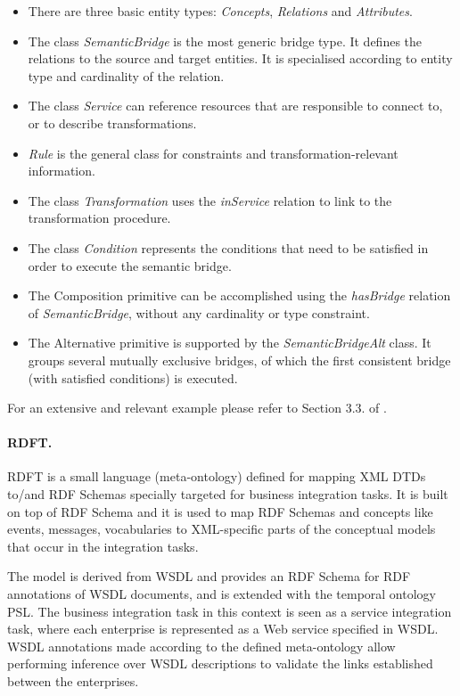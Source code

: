 \documentclass{fast_latex}
\begin{document}
\begin{itemize}
\item There are three basic entity types: \textit{Concepts},
\textit{Relations} and \textit{Attributes}. 
\item The class \textit{SemanticBridge} is the most generic bridge type.
It defines the relations to the source and target entities. It is
specialised according to entity type and cardinality of the relation. 
\item The class \textit{Service} can reference resources that are
responsible to connect to, or to describe transformations. 
\item \textit{Rule} is the general class for constraints and
transformation-relevant information. 
\item The class \textit{Transformation} uses the \textit{inService}
relation to link to the transformation procedure. 
\item The class \textit{Condition} represents the conditions that need
to be satisfied in order to execute the semantic bridge. 
\item The Composition primitive can be accomplished using the
\textit{hasBridge} relation of \textit{SemanticBridge}, without any
cardinality or type constraint. 
\item The Alternative primitive is supported by the
\textit{SemanticBridgeAlt} class. It groups several mutually exclusive
bridges, of which the first consistent bridge (with satisfied
conditions) is executed. 
\end{itemize}
For an extensive and relevant example please refer to Section 3.3. of
\cite{maedche2002mafra}.

\paragraph{RDFT.}
RDFT \cite{omelayenko2002rdft} is a small language (meta-ontology) defined for
mapping XML DTDs to/and RDF Schemas specially targeted for business
integration tasks. It is built on top of RDF Schema and it is used to
map RDF Schemas and concepts like events, messages, vocabularies to
XML-specific parts of the conceptual models that occur in the
integration tasks. 

The model is derived from WSDL \cite{christensen2001wsdl} and provides
an RDF Schema for RDF annotations of WSDL documents, and is extended
with the temporal ontology PSL. The business integration task in this
context is seen as a service integration task, where each enterprise is
represented as a Web service specified in WSDL. WSDL annotations made
according to the defined meta-ontology allow performing inference over
WSDL descriptions to validate the links established between the
enterprises. 
\end{document}
